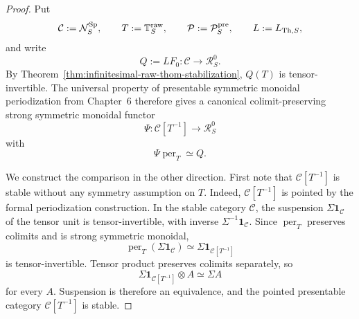 \begin{proof}
Put
\[
    \mathcal C:=\mathcal N_S^{\mathrm{Sp}},
    \qquad
    T:=\mathbb T_S^{\mathrm{raw}},
    \qquad
    \mathcal P:=\mathcal P_S^{\mathrm{pre}},
    \qquad
    L:=L_{\mathrm{Th},S},
\]
and write
\[
    Q:=LF_0:\mathcal C\longrightarrow\mathcal R_S^0.
\]
By Theorem~\ref{thm:infinitesimal-raw-thom-stabilization}, $Q(T)$ is
tensor-invertible.  The universal property of presentable symmetric monoidal
periodization from Chapter~6 therefore gives a canonical colimit-preserving
strong symmetric monoidal functor
\[
    \Psi:
    \mathcal C[T^{-1}]
    \longrightarrow
    \mathcal R_S^0
\]
with
\[
    \Psi\operatorname{per}_T\simeq Q.
\]

We construct the comparison in the other direction.  First note that
$\mathcal C[T^{-1}]$ is stable without any symmetry assumption on $T$.
Indeed, $\mathcal C[T^{-1}]$ is pointed by the formal periodization
construction.  In the stable category $\mathcal C$, the suspension
$\Sigma\mathbf1_{\mathcal C}$ of the tensor unit is tensor-invertible, with
inverse $\Sigma^{-1}\mathbf1_{\mathcal C}$.  Since
$\operatorname{per}_T$ preserves colimits and is strong symmetric monoidal,
\[
    \operatorname{per}_T(\Sigma\mathbf1_{\mathcal C})
    \simeq
    \Sigma\mathbf1_{\mathcal C[T^{-1}]}
\]
is tensor-invertible.  Tensor product preserves colimits separately, so
\[
    \Sigma\mathbf1_{\mathcal C[T^{-1}]}\otimes A
    \simeq
    \Sigma A
\]
for every $A$.  Suspension is therefore an equivalence, and the pointed
presentable category $\mathcal C[T^{-1}]$ is stable.


\end{proof}
